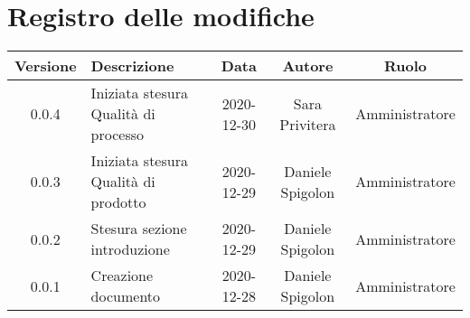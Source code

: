 \section*{Registro delle modifiche}

\begin{center}
	\begin{longtable}{|c|p{5cm}|c|c|c|}
	\hline
	\rowcolor{lighter-grayer}
	\textbf{Versione} & \textbf{Descrizione} & \textbf{Data} & \textbf{Autore} & \textbf{Ruolo} \\
	\hline
	\endfirsthead

	0.0.4 & Iniziata stesura Qualità di processo & 2020-12-30 & Sara Privitera & Amministratore \\
	\hline
	0.0.3 & Iniziata stesura Qualità di prodotto & 2020-12-29 & Daniele Spigolon & Amministratore \\
	\hline
	0.0.2 & Stesura sezione introduzione & 2020-12-29 & Daniele Spigolon & Amministratore \\
	\hline
	0.0.1 & Creazione documento & 2020-12-28 & Daniele Spigolon & Amministratore \\
	\hline

	\end{longtable}
\end{center}